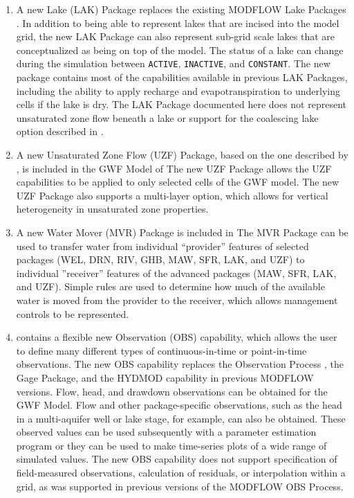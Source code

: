\begin{enumerate}
\item A new Lake (LAK) Package replaces the existing MODFLOW Lake Packages \citep{modflowlak3pack}. In addition to being able to represent lakes that are incised into the model grid, the new LAK Package can also represent sub-grid scale lakes that are conceptualized as being on top of the model.  The status of a lake can change during the simulation between \texttt{ACTIVE}, \texttt{INACTIVE}, and \texttt{CONSTANT}.  The new package contains most of the capabilities available in previous LAK Packages, including the ability to apply recharge and evapotranspiration to underlying cells if the lake is dry.  The LAK Package documented here does not represent unsaturated zone flow beneath a lake or support for the coalescing lake option described in \cite{modflowlak3pack}. 

\item A new Unsaturated Zone Flow (UZF) Package, based on the one described by \cite{UZF}, is included in the GWF Model of \mfdot The new UZF Package allows the UZF capabilities to be applied to only selected cells of the GWF model. The new UZF Package also supports a multi-layer option, which allows for vertical heterogeneity in unsaturated zone properties.

\item A new Water Mover (MVR) Package is included in \mfdot  The MVR Package can be used to transfer water from individual ``provider'' features of selected packages (WEL, DRN, RIV, GHB, MAW, SFR, LAK, and UZF) to individual ''receiver'' features of the advanced packages (MAW, SFR, LAK, and UZF).  Simple rules are used to determine how much of the available water is moved from the provider to the receiver, which allows management controls to be represented. 

\item \mf contains a flexible new Observation (OBS) capability, which allows the user to define many different types of continuous-in-time or point-in-time observations.  The new OBS capability replaces the Observation Process \citep{hill2000modflow}, the Gage Package, and the HYDMOD capability \citep{hanson1999documentation} in previous MODFLOW versions.  Flow, head, and drawdown observations can be obtained for the GWF Model.  Flow and other package-specific observations, such as the head in a multi-aquifer well or lake stage, for example, can also be obtained.  These observed values can be used subsequently with a parameter estimation program or they can be used to make time-series plots of a wide range of simulated values.  The new OBS capability does not support specification of field-measured observations, calculation of residuals, or interpolation within a grid, as was supported in previous versions of the MODFLOW OBS Process.


\end{enumerate}
